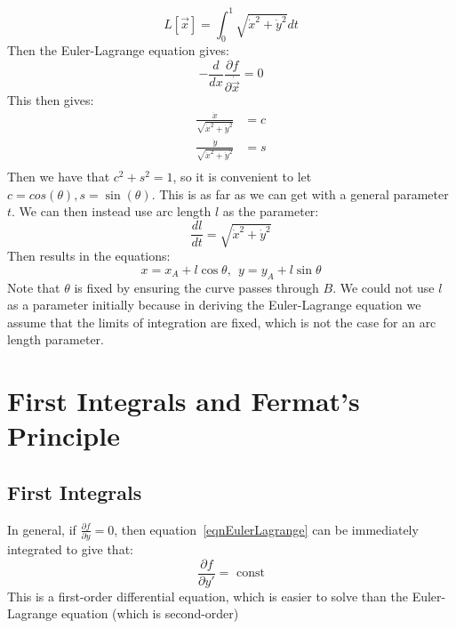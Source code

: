 \documentclass[../Main.tex]{subfiles}
\begin{document}
\begin{equation*}
    L[\vec{x}] = \int_0^1 \sqrt{\dot{x}^2 + \dot{y}^2} dt
\end{equation*}
Then the Euler-Lagrange equation gives:
\begin{equation*}
    -\frac{d}{dx} \frac{\partial f}{\partial \dot{\vec{x}}} = 0
\end{equation*}
This then gives:
\begin{align*}
    \frac{\dot{x}}{\sqrt{\dot{x}^2 + \dot{y}^2}} &= c \\
    \frac{\dot{y}}{\sqrt{\dot{x}^2 + \dot{y}^2}} &= s \\
\end{align*}
Then we have that $c^2 + s^2 = 1$, so it is convenient to let $c = cos(\theta), s = \sin(\theta)$.
This is as far as we can get with a general parameter $t$. We can then instead use arc length $l$ as the parameter:
\begin{equation*}
    \frac{dl}{dt} = \sqrt{\dot{x}^2 + \dot{y}^2}
\end{equation*}
Then results in the equations:
\begin{equation*}
    x = x_A + l \cos{\theta},~~y = y_A + l\sin{\theta}
\end{equation*}
Note that $\theta$ is fixed by ensuring the curve passes through $B$. We could not use $l$ as a parameter initially because in deriving the Euler-Lagrange equation we assume that the limits of integration are fixed, which is not the case for an arc length parameter.
\section{First Integrals and Fermat's Principle}
\subsection{First Integrals}
In general, if $\frac{\partial f}{\partial y} = 0$, then equation~\ref{eqnEulerLagrange} can be immediately integrated to give that:
\begin{equation}
    \frac{\partial f}{\partial y'} = \text{ const}
    \label{eqnFirstIntegral}
\end{equation}
This is a first-order differential equation, which is easier to solve than the Euler-Lagrange equation (which is second-order)
\end{document}
